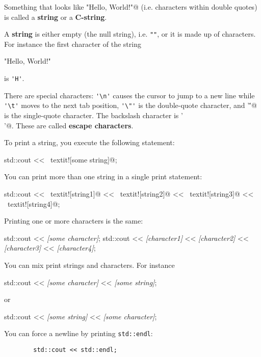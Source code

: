 Something that looks like 
\verb@"Hello, World!\n"@ 
(i.e. characters within double quotes) is called a 
\textbf{string} or a 
\textbf{C-string}.

A \textbf{string} is either empty (the null string), 
i.e. \verb!""!, or it is made up of characters. 
For instance the first character of the string
\begin{console}[frame=none]
 
    "Hello, World!\n"

\end{console}
is \verb!'H'!.

There are special characters: 
\verb!'\n'! causes the cursor to jump to a new line while 
\verb!'\t'! moves to the next tab position, 
\verb!'\"'! is the double-quote character, 
and \verb@'\''@ is the single-quote character. 
The backslash character is \verb@'\\'@. 
These are called \textbf{escape characters}.

To print a string, you execute the following statement:
\begin{console}[frame=none, commandchars=\~\!\@]

        std::cout << ~textit![some string]@;

\end{console}
You can print more than one string in a single print statement:
\begin{console}[frame=none, commandchars=\~\!\@]

        std::cout << ~textit![string1]@ << ~textit![string2]@
                  << ~textit![string3]@ << ~textit![string4]@;

\end{console}
Printing one or more characters is the same:
\begin{console}[frame=none, commandchars=\\\{\}]

        std::cout << \textit{[some character]};
        std::cout << \textit{[character1]} << \textit{[character2]}
                  << \textit{[character3]} << \textit{[character4]};

\end{console}

You can mix print strings and characters. For instance
\begin{console}[frame=none, commandchars=\\\{\}]

        std::cout << \textit{[some character]}
	          << \textit{[some string]};

\end{console}
or
\begin{console}[frame=none, commandchars=\\\{\}]

        std::cout << \textit{[some string]}
	          << \textit{[some character]};

\end{console}
You can force a newline by printing \verb!std::endl!:
\begin{verbatim}
        std::cout << std::endl;
\end{verbatim}



